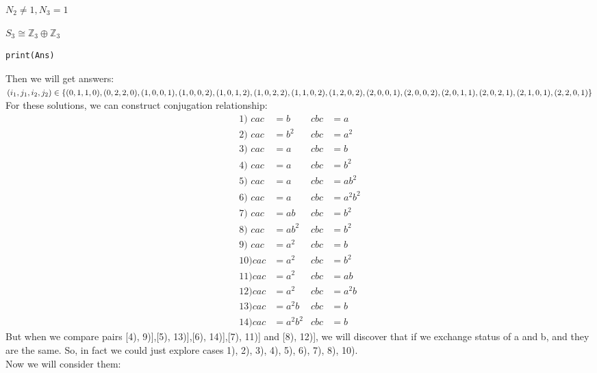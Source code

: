 \documentclass[a4paper,14pt]{article}
\begin{document}
\begin{enumerate}
\begin{item}{$N_2 \neq 1, N_3 = 1$}
\begin{enumerate}
\begin{item}{$S_3\cong \mathbb{Z}_3 \oplus \mathbb{Z}_3$}
\begin{verbatim}
print(Ans)
                    \end{verbatim}
                    Then we will get answers:
                    $(i_1,j_1,i_2,j_2) \in \{(0, 1, 1, 0), (0, 2, 2, 0), (1, 0, 0, 1), (1, 0, 0, 2), (1, 0, 1, 2),\\
                     (1, 0, 2, 2), (1, 1, 0, 2), (1, 2, 0, 2), (2, 0, 0, 1), (2, 0, 0, 2), (2, 0, 1, 1), (2, 0, 2, 1),\\
                     (2, 1, 0, 1), (2, 2, 0, 1)\}$\\
                     For these solutions, we can construct conjugation relationship:
                     \begin{align*}
                         \text{1) } cac&=b      &   cbc&=a\\
                         \text{2) } cac&=b^2    &   cbc&=a^2\\
                         \text{3) } cac&=a      &   cbc&=b\\
                         \text{4) } cac&=a      &   cbc&=b^2\\
                         \text{5) } cac&=a      &   cbc&=ab^2\\
                         \text{6) } cac&=a      &   cbc&=a^2b^2\\
                         \text{7) } cac&=ab     &   cbc&=b^2\\
                         \text{8) } cac&=ab^2   &   cbc&=b^2\\
                         \text{9) } cac&=a^2    &   cbc&=b\\
                         \text{10)} cac&=a^2    &   cbc&=b^2\\
                         \text{11)} cac&=a^2    &   cbc&=ab\\
                         \text{12)} cac&=a^2    &   cbc&=a^2b\\
                         \text{13)} cac&=a^2b   &   cbc&=b\\
                         \text{14)} cac&=a^2b^2 &   cbc&=b
                     \end{align*}
                     But when we compare pairs [4), 9)],[5), 13)],[6), 14)],[7), 11)] and [8), 12)], we will discover that if we exchange status of a and b, and
                     they are the same. So, in fact we could just explore cases 1), 2), 3), 4), 5), 6), 7), 8), 10).\\
                     Now we will consider them:
                     \begin{enumerate}

\end{enumerate}
\end{item}
\end{enumerate}
\end{item}
\end{enumerate}
\end{document}
